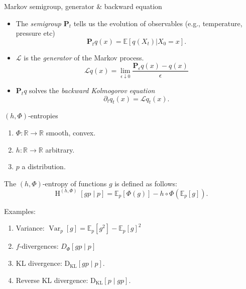 \documentclass{beamer}
\newcommand{\e}{\epsilon}
\newcommand{\E}{\mathbb E}
\renewcommand{\H}{\operatorname{H}}
\newcommand{\dkl}{\operatorname{D_{K L}}}
\begin{document}
\begin{frame}{Markov semigroup, generator \& backward equation}
\begin{itemize}
    \item The \textit{semigroup} $\mathbf{P}_{t}$ tells us the evolution of observables (e.g., temperature, pressure etc)
    \begin{equation*}
    \mathbf{P}_{t}q(x) = \E [q(X_t)|X_0=x].
    \end{equation*}
    \item $\mathcal L$ is the \textit{generator} of the Markov process.
    \begin{equation*}
    \mathcal{L} q(x)= \lim_{\e \downarrow 0} \frac{\mathbf{P}_{\e} q(x) - q(x)}{\e}
    \end{equation*}
    \item $\mathbf{P}_{t}q$ solves the \textit{backward Kolmogorov equation}
    \begin{equation*}
        \partial_t q_{t}(x) = \mathcal L q_t(x).
    \end{equation*}
\end{itemize}
\end{frame}

\begin{frame}{$(h, \Phi)$-entropies}
\begin{definition}
\begin{enumerate}
    \item $\Phi: \mathbb R \rightarrow \mathbb{R}$ smooth, convex.
    \item $h :\mathbb{R} \to \mathbb{R}$ arbitrary.
    \item $p$ a distribution.
\end{enumerate}
The $(h, \Phi)$-entropy of functions $g$ is defined as follows:
\begin{equation*}
    \H^{(h,\Phi)}[gp\mid p ]= \E_p[ \Phi ( g)] - h \circ \Phi \left(\E_p [ g ]\right).
\end{equation*}
\end{definition}
Examples:
\begin{enumerate}
    \item Variance: $ \operatorname{Var}_p[g]= \E_p[ g^2] -  \E_p [ g ]^2$
    \item $f$-divergences: $D_\Phi[g p \mid p ]$ %
    \item KL divergence: $\dkl[g p \mid p]$.
    \item Reverse KL divergence: $\dkl[p \mid gp]$.
\end{enumerate}
\end{frame}
\end{document}
